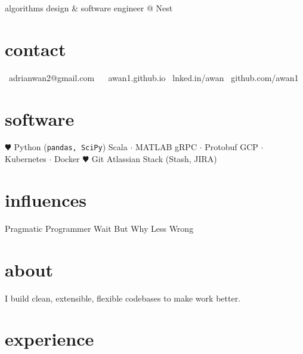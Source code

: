 \documentclass[]{friggeri-cv}
\begin{document}
       {algorithms design \& software engineer @ Nest}


\begin{aside}
  \section{contact}
    \href{mailto:adrianwan2@gmail.com?subject=Regarding%20your%20resume}{\faEnvelope}~adrianwan2@gmail.com
    ~
    \href{http://awan1.github.io}{\faGlobe}~awan1.github.io
    \href{http://linkedin.com/in/adrianwan2}{\faLinkedin}~lnked.in/awan
    \href{http://github.com/awan1}{\faGithub}~github.com/awan1
  \section{software}
    {\color{red} $\varheart$} Python
    (\texttt{pandas, SciPy})
    Scala $\cdot$ MATLAB
    gRPC $\cdot$ Protobuf
    GCP $\cdot$ Kubernetes $\cdot$ Docker
    {\color{red} $\varheart$} Git
    Atlassian Stack
    (Stash, JIRA)
  \section{influences}
    Pragmatic Programmer
    Wait But Why
    Less Wrong
\end{aside}

\section{about}
I build clean, extensible, flexible codebases to make work better.


\section{experience}
\end{document}
